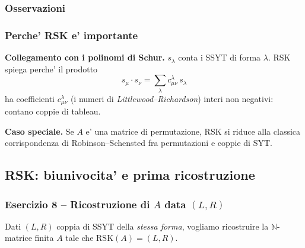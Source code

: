 \subsubsection{Osservazioni}




\subsubsection{Perche' RSK e' importante}

\textbf{Collegamento con i polinomi di Schur.} $ s_\lambda $ conta i SSYT di forma $ \lambda $. RSK spiega perche' il prodotto
\[
  s_\mu \cdot s_\nu = \sum_\lambda c^\lambda_{\mu \nu}\, s_\lambda
\]
ha coefficienti $ c^\lambda_{\mu \nu} $ (i numeri di \textit{Littlewood--Richardson}) interi non negativi: contano coppie di tableau.

\textbf{Caso speciale.} Se $ A $ e' una matrice di permutazione, RSK si riduce alla classica corrispondenza di Robinson--Schensted fra permutazioni e coppie di SYT.

\subsection{RSK: biunivocita' e prima ricostruzione}

\subsubsection{Esercizio 8 -- Ricostruzione di $A$ data $(L,R)$}

Dati $ (L,R) $ coppia di SSYT della \textit{stessa forma}, vogliamo ricostruire la $ \mathbb{N} $-matrice finita $ A $ tale che $ \mathrm{RSK}(A) = (L,R) $.

